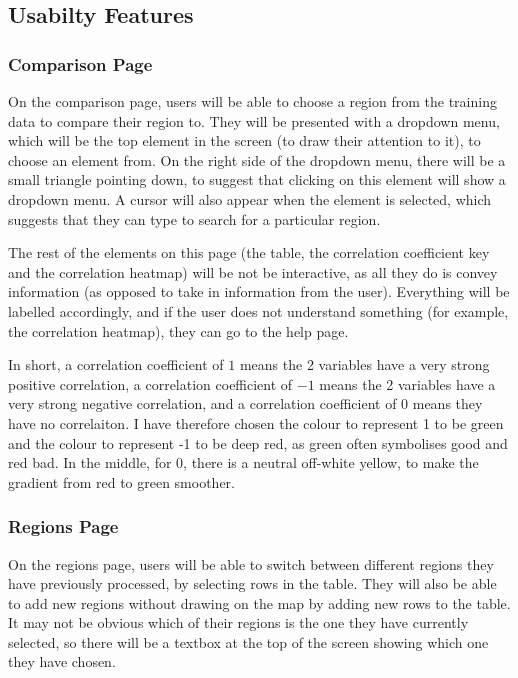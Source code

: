 \documentclass[12pt]{report}
\begin{document}
\subsection{Usabilty Features}
\subsubsection{Comparison Page}
On the comparison page, users will be able to choose a region from the training data to compare their region to. They will be presented with a dropdown menu, which will be the top element in the screen (to draw their attention to it), to choose an element from. On the right side of the dropdown menu, there will be a small triangle pointing down, to suggest that clicking on this element will show a dropdown menu. A cursor will also appear when the element is selected, which suggests that they can type to search for a particular region.

The rest of the elements on this page (the table, the correlation coefficient key and the correlation heatmap) will be not be interactive, as all they do is convey information (as opposed to take in information from the user). Everything will be labelled accordingly, and if the user does not understand something (for example, the correlation heatmap), they can go to the help page.

In short, a correlation coefficient of $1$ means the 2 variables have a very strong positive correlation, a correlation coefficient of $-1$ means the 2 variables have a very strong negative correlation, and a correlation coefficient of $0$ means they have no correlaiton. I have therefore chosen the colour to represent 1 to be green and the colour to represent -1 to be deep red, as green often symbolises good and red bad. In the middle, for 0, there is a neutral off-white yellow, to make the gradient from red to green smoother.

\subsubsection{Regions Page}
On the regions page, users will be able to switch between different regions they have previously processed, by selecting rows in the table. They will also be able to add new regions without drawing on the map by adding new rows to the table. It may not be obvious which of their regions is the one they have currently selected, so there will be a textbox at the top of the screen showing which one they have chosen.
\end{document}
